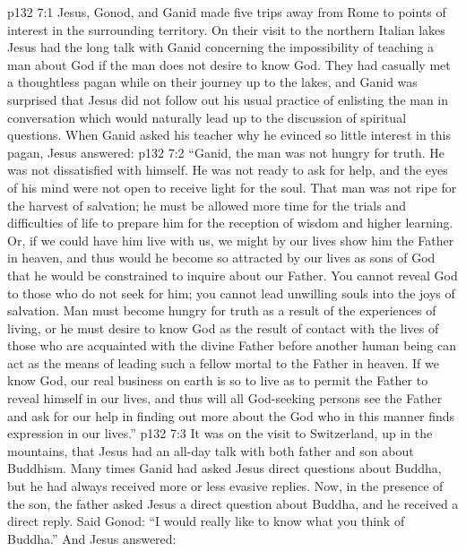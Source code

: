 \vs p132 7:1 Jesus, Gonod, and Ganid made five trips away from Rome to points of interest in the surrounding territory. On their visit to the northern Italian lakes Jesus had the long talk with Ganid concerning the impossibility of teaching a man about God if the man does not desire to know God. They had casually met a thoughtless pagan while on their journey up to the lakes, and Ganid was surprised that Jesus did not follow out his usual practice of enlisting the man in conversation which would naturally lead up to the discussion of spiritual questions. When Ganid asked his teacher why he evinced so little interest in this pagan, Jesus answered:\plusone
\pc \vs p132 7:2 \textcolor{ubdarkred}{“Ganid, the man was not hungry for truth. He was not dissatisfied with himself. He was not ready to ask for help, and the eyes of his mind were not open to receive light for the soul. That man was not ripe for the harvest of salvation; he must be allowed more time for the trials and difficulties of life to prepare him for the reception of wisdom and higher learning. Or, if we could have him live with us, we might by our lives show him the Father in heaven, and thus would he become so attracted by our lives as sons of God that he would be constrained to inquire about our Father. You cannot reveal God to those who do not seek for him; you cannot lead unwilling souls into the joys of salvation. Man must become hungry for truth as a result of the experiences of living, or he must desire to know God as the result of contact with the lives of those who are acquainted with the divine Father before another human being can act as the means of leading such a fellow mortal to the Father in heaven. If we know God, our real business on earth is so to live as to permit the Father to reveal himself in our lives, and thus will all God\hyp{}seeking persons see the Father and ask for our help in finding out more about the God who in this manner finds expression in our lives.”}
\pc \vs p132 7:3 It was on the visit to Switzerland, up in the mountains, that Jesus had an all\hyp{}day talk with both father and son about Buddhism. Many times Ganid had asked Jesus direct questions about Buddha, but he had always received more or less evasive replies. Now, in the presence of the son, the father asked Jesus a direct question about Buddha, and he received a direct reply. Said Gonod: “I would really like to know what you think of Buddha.” And Jesus answered:
